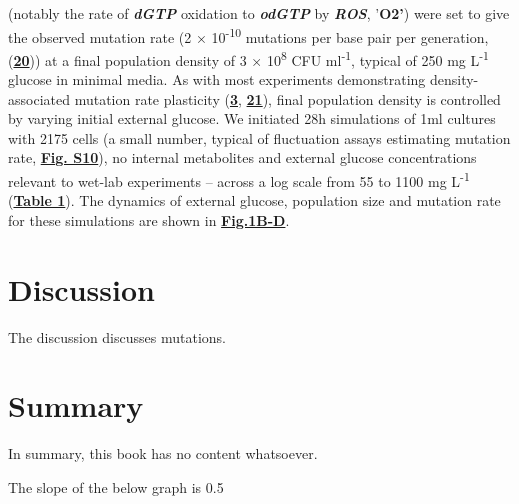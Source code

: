 \documentclass[
  12pt,
  letterpaper,
  DIV=11,
  numbers=noendperiod]{scrreprt}
\begin{document}
(notably the rate of \textbf{\emph{dGTP}} oxidation to
\textbf{\emph{odGTP}} by \textbf{\emph{ROS}}, '\textbf{O2'}) were set to
give the observed mutation rate (2 × 10\textsuperscript{-10} mutations
per base pair per generation,
(\href{https://www.biorxiv.org/content/10.1101/2023.09.27.557722v1.full\#ref-20}{\textbf{20}}))
at a final population density of 3 × 10\textsuperscript{8} CFU
ml\textsuperscript{-1}, typical of 250 mg L\textsuperscript{-1} glucose
in minimal media. As with most experiments demonstrating
density-associated mutation rate plasticity
(\href{https://www.biorxiv.org/content/10.1101/2023.09.27.557722v1.full\#ref-3}{\textbf{3}},
\href{https://www.biorxiv.org/content/10.1101/2023.09.27.557722v1.full\#ref-21}{\textbf{21}}),
final population density is controlled by varying initial external
glucose. We initiated 28h simulations of 1ml cultures with 2175 cells (a
small number, typical of fluctuation assays estimating mutation rate,
\href{https://www.biorxiv.org/content/10.1101/2023.09.27.557722v1.full\#F14}{\textbf{Fig.
S10}}), no internal metabolites and external glucose concentrations
relevant to wet-lab experiments -- across a log scale from 55 to 1100 mg
L\textsuperscript{-1}
(\href{https://www.biorxiv.org/content/10.1101/2023.09.27.557722v1.full\#T1}{\textbf{Table
1}}). The dynamics of external glucose, population size and mutation
rate for these simulations are shown in
\href{https://www.biorxiv.org/content/10.1101/2023.09.27.557722v1.full\#F1}{\textbf{Fig.1B-D}}.


\hypertarget{discussion}{%
\chapter{Discussion}\label{discussion}}

The discussion discusses mutations.


\hypertarget{summary}{%
\chapter{Summary}\label{summary}}

In summary, this book has no content whatsoever.

The slope of the below graph is 0.5
\end{document}
